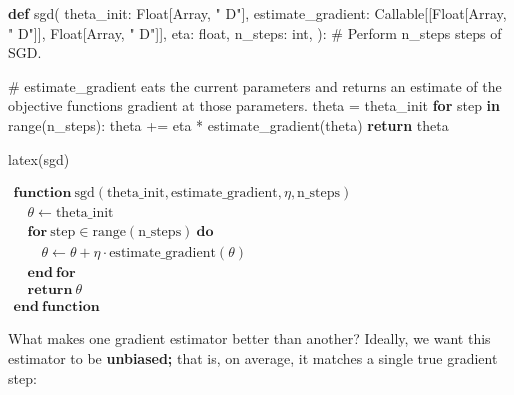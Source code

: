 \documentclass[
  letterpaper,
  DIV=11,
  numbers=noendperiod]{scrreprt}
\newenvironment{Shaded}{\begin{snugshade}}{\end{snugshade}}
\newcommand{\BuiltInTok}[1]{\textcolor[rgb]{0.00,0.23,0.31}{#1}}
\newcommand{\CommentTok}[1]{\textcolor[rgb]{0.37,0.37,0.37}{#1}}
\newcommand{\ControlFlowTok}[1]{\textcolor[rgb]{0.00,0.23,0.31}{\textbf{#1}}}
\newcommand{\KeywordTok}[1]{\textcolor[rgb]{0.00,0.23,0.31}{\textbf{#1}}}
\newcommand{\NormalTok}[1]{\textcolor[rgb]{0.00,0.23,0.31}{#1}}
\newcommand{\OperatorTok}[1]{\textcolor[rgb]{0.37,0.37,0.37}{#1}}
\newcommand{\StringTok}[1]{\textcolor[rgb]{0.13,0.47,0.30}{#1}}
\theoremstyle{plain}
\theoremstyle{plain}
\theoremstyle{definition}
\theoremstyle{definition}
\theoremstyle{remark}
\begin{document}
\begin{Shaded}
\begin{Highlighting}[]
\KeywordTok{def}\NormalTok{ sgd(}
\NormalTok{    theta\_init: Float[Array, }\StringTok{" D"}\NormalTok{],}
\NormalTok{    estimate\_gradient: Callable[[Float[Array, }\StringTok{" D"}\NormalTok{]], Float[Array, }\StringTok{" D"}\NormalTok{]],}
\NormalTok{    eta: }\BuiltInTok{float}\NormalTok{,}
\NormalTok{    n\_steps: }\BuiltInTok{int}\NormalTok{,}
\NormalTok{):}
    \CommentTok{\# Perform \textasciigrave{}n\_steps\textasciigrave{} steps of SGD.}

    \CommentTok{\# \textasciigrave{}estimate\_gradient\textasciigrave{} eats the current parameters and returns an estimate of the objective function\textquotesingle{}s gradient at those parameters.}
\NormalTok{    theta }\OperatorTok{=}\NormalTok{ theta\_init}
    \ControlFlowTok{for}\NormalTok{ step }\KeywordTok{in} \BuiltInTok{range}\NormalTok{(n\_steps):}
\NormalTok{        theta }\OperatorTok{+=}\NormalTok{ eta }\OperatorTok{*}\NormalTok{ estimate\_gradient(theta)}
    \ControlFlowTok{return}\NormalTok{ theta}

\NormalTok{latex(sgd)}
\end{Highlighting}
\end{Shaded}

$ \begin{array}{l} \mathbf{function} \ \mathrm{sgd}(\mathrm{theta\_init}, \mathrm{estimate\_gradient}, \eta, \mathrm{n\_steps}) \\ \hspace{1em} \theta \gets \mathrm{theta\_init} \\ \hspace{1em} \mathbf{for} \ \mathrm{step} \in \mathrm{range} \mathopen{}\left( \mathrm{n\_steps} \mathclose{}\right) \ \mathbf{do} \\ \hspace{2em} \theta \gets \theta + \eta \cdot \mathrm{estimate\_gradient} \mathopen{}\left( \theta \mathclose{}\right) \\ \hspace{1em} \mathbf{end \ for} \\ \hspace{1em} \mathbf{return} \ \theta \\ \mathbf{end \ function} \end{array} $

What makes one gradient estimator better than another? Ideally, we want
this estimator to be \textbf{unbiased;} that is, on average, it matches
a single true gradient step:
\end{document}
